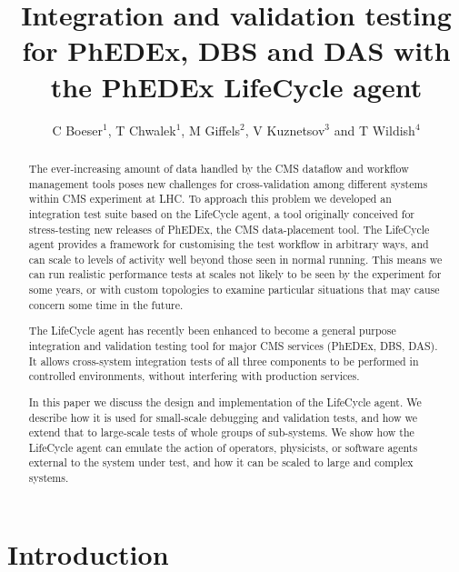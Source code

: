 \documentclass[a4paper]{jpconf}
\begin{document}
\title{Integration and validation testing for PhEDEx, DBS and DAS with the PhEDEx LifeCycle agent}

\author{C Boeser$^1$, T Chwalek$^1$, M Giffels$^2$, V Kuznetsov$^3$
        and T Wildish$^4$}

\address{$^1$ Institut f\"ur Experimentelle Kernphysik, Karlsruhe, Germany}
\address{$^2$ PH-CMG-CO, CERN, CH-1211 Gen\`eve 23, Switzerland}
\address{$^3$ Cornell University, Ithaca, NY, USA }
\address{$^4$ Princeton University, Princeton, NJ, USA }


\begin{abstract}
The ever-increasing amount of data handled by the CMS dataflow and workflow management tools poses new challenges for cross-validation among different systems within CMS experiment at LHC. To approach this problem we developed an integration test suite based on the LifeCycle agent, a tool originally conceived for stress-testing new releases of PhEDEx, the CMS data-placement tool. The LifeCycle agent provides a framework for customising the test workflow in arbitrary ways, and can scale to levels of activity well beyond those seen in normal running. This means we can run realistic performance tests at scales not likely to be seen by the experiment for some years, or with custom topologies to examine particular situations that may cause concern some time in the future.

The LifeCycle agent has recently been enhanced to become a general purpose integration and validation testing tool for major CMS services (PhEDEx, DBS, DAS). It allows cross-system integration tests of all three components to be performed in controlled environments, without interfering with production services.

In this paper we discuss the design and implementation of the LifeCycle agent. We describe how it is used for small-scale debugging and validation tests, and how we extend that to large-scale tests of whole groups of sub-systems. We show how the LifeCycle agent can emulate the action of operators, physicists, or software agents external to the system under test, and how it can be scaled to large and complex systems.
\end{abstract}

\section{Introduction}

\end{document}
